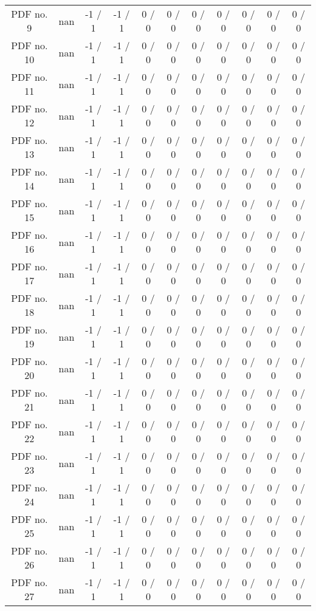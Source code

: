 \begin{table}[htbp]
\begin{center}
\begin{tabular}{|c|c|c|c|c|c|c|c|c|c|c|}
  PDF no. 9 &    nan    & -1 / 1 & -1 / 1 & 0 / 0 & 0 / 0 & 0 / 0 & 0 / 0 & 0 / 0 & 0 / 0 & 0 / 0 \\ 
  PDF no. 10 &    nan    & -1 / 1 & -1 / 1 & 0 / 0 & 0 / 0 & 0 / 0 & 0 / 0 & 0 / 0 & 0 / 0 & 0 / 0 \\ 
  PDF no. 11 &    nan    & -1 / 1 & -1 / 1 & 0 / 0 & 0 / 0 & 0 / 0 & 0 / 0 & 0 / 0 & 0 / 0 & 0 / 0 \\ 
  PDF no. 12 &    nan    & -1 / 1 & -1 / 1 & 0 / 0 & 0 / 0 & 0 / 0 & 0 / 0 & 0 / 0 & 0 / 0 & 0 / 0 \\ 
  PDF no. 13 &    nan    & -1 / 1 & -1 / 1 & 0 / 0 & 0 / 0 & 0 / 0 & 0 / 0 & 0 / 0 & 0 / 0 & 0 / 0 \\ 
  PDF no. 14 &    nan    & -1 / 1 & -1 / 1 & 0 / 0 & 0 / 0 & 0 / 0 & 0 / 0 & 0 / 0 & 0 / 0 & 0 / 0 \\ 
  PDF no. 15 &    nan    & -1 / 1 & -1 / 1 & 0 / 0 & 0 / 0 & 0 / 0 & 0 / 0 & 0 / 0 & 0 / 0 & 0 / 0 \\ 
  PDF no. 16 &    nan    & -1 / 1 & -1 / 1 & 0 / 0 & 0 / 0 & 0 / 0 & 0 / 0 & 0 / 0 & 0 / 0 & 0 / 0 \\ 
  PDF no. 17 &    nan    & -1 / 1 & -1 / 1 & 0 / 0 & 0 / 0 & 0 / 0 & 0 / 0 & 0 / 0 & 0 / 0 & 0 / 0 \\ 
  PDF no. 18 &    nan    & -1 / 1 & -1 / 1 & 0 / 0 & 0 / 0 & 0 / 0 & 0 / 0 & 0 / 0 & 0 / 0 & 0 / 0 \\ 
  PDF no. 19 &    nan    & -1 / 1 & -1 / 1 & 0 / 0 & 0 / 0 & 0 / 0 & 0 / 0 & 0 / 0 & 0 / 0 & 0 / 0 \\ 
  PDF no. 20 &    nan    & -1 / 1 & -1 / 1 & 0 / 0 & 0 / 0 & 0 / 0 & 0 / 0 & 0 / 0 & 0 / 0 & 0 / 0 \\ 
  PDF no. 21 &    nan    & -1 / 1 & -1 / 1 & 0 / 0 & 0 / 0 & 0 / 0 & 0 / 0 & 0 / 0 & 0 / 0 & 0 / 0 \\ 
  PDF no. 22 &    nan    & -1 / 1 & -1 / 1 & 0 / 0 & 0 / 0 & 0 / 0 & 0 / 0 & 0 / 0 & 0 / 0 & 0 / 0 \\ 
  PDF no. 23 &    nan    & -1 / 1 & -1 / 1 & 0 / 0 & 0 / 0 & 0 / 0 & 0 / 0 & 0 / 0 & 0 / 0 & 0 / 0 \\ 
  PDF no. 24 &    nan    & -1 / 1 & -1 / 1 & 0 / 0 & 0 / 0 & 0 / 0 & 0 / 0 & 0 / 0 & 0 / 0 & 0 / 0 \\ 
  PDF no. 25 &    nan    & -1 / 1 & -1 / 1 & 0 / 0 & 0 / 0 & 0 / 0 & 0 / 0 & 0 / 0 & 0 / 0 & 0 / 0 \\ 
  PDF no. 26 &    nan    & -1 / 1 & -1 / 1 & 0 / 0 & 0 / 0 & 0 / 0 & 0 / 0 & 0 / 0 & 0 / 0 & 0 / 0 \\ 
  PDF no. 27 &    nan    & -1 / 1 & -1 / 1 & 0 / 0 & 0 / 0 & 0 / 0 & 0 / 0 & 0 / 0 & 0 / 0 & 0 / 0 \\ 

\end{tabular}
\end{center}
\end{table}
